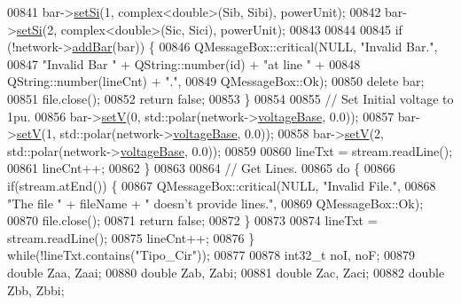 \begin{DoxyCode}
00841     bar->\hyperlink{group___models_ga74e510be49e50e4c14550b32e1dc92f9}{setSi}(1, complex<double>(Sib, Sibi), powerUnit);
00842     bar->\hyperlink{group___models_ga74e510be49e50e4c14550b32e1dc92f9}{setSi}(2, complex<double>(Sic, Sici), powerUnit);
00843 
00844 
00845     \textcolor{keywordflow}{if} (!network->\hyperlink{group___graphics_ga8c5dfef0216731246f7411e1a5fbee01}{addBar}(bar)) \{
00846       QMessageBox::critical(NULL, \textcolor{stringliteral}{"Invalid Bar."},
00847                             \textcolor{stringliteral}{"Invalid Bar "} + QString::number(\textcolor{keywordtype}{id}) + \textcolor{stringliteral}{"at line "} +
00848                             QString::number(lineCnt) + \textcolor{stringliteral}{"."},
00849                             QMessageBox::Ok);
00850       \textcolor{keyword}{delete} bar;
00851       file.close();
00852       \textcolor{keywordflow}{return} \textcolor{keyword}{false};
00853     \}
00854 
00855     \textcolor{comment}{// Set Initial voltage to 1pu.}
00856     bar->\hyperlink{group___models_ga9b6fbc92674bfcdc9d5090795ab335a6}{setV}(0, std::polar(network->\hyperlink{group___graphics_ga7c1e79d9ac69df9a69f24eaf092fd5e5}{voltageBase}, 0.0));
00857     bar->\hyperlink{group___models_ga9b6fbc92674bfcdc9d5090795ab335a6}{setV}(1, std::polar(network->\hyperlink{group___graphics_ga7c1e79d9ac69df9a69f24eaf092fd5e5}{voltageBase}, 0.0));
00858     bar->\hyperlink{group___models_ga9b6fbc92674bfcdc9d5090795ab335a6}{setV}(2, std::polar(network->\hyperlink{group___graphics_ga7c1e79d9ac69df9a69f24eaf092fd5e5}{voltageBase}, 0.0));
00859 
00860     lineTxt = stream.readLine();
00861     lineCnt++;
00862   \}
00863 
00864   \textcolor{comment}{// Get Lines.}
00865   \textcolor{keywordflow}{do} \{
00866     \textcolor{keywordflow}{if}(stream.atEnd()) \{
00867       QMessageBox::critical(NULL, \textcolor{stringliteral}{"Invalid File."},
00868                             \textcolor{stringliteral}{"The file "} + fileName + \textcolor{stringliteral}{" doesn't provide lines."},
00869                             QMessageBox::Ok);
00870       file.close();
00871       \textcolor{keywordflow}{return} \textcolor{keyword}{false};
00872     \}
00873 
00874     lineTxt = stream.readLine();
00875     lineCnt++;
00876   \} \textcolor{keywordflow}{while}(!lineTxt.contains(\textcolor{stringliteral}{"Tipo\_Cir"}));
00877 
00878   int32\_t noI, noF;
00879   \textcolor{keywordtype}{double} Zaa, Zaai;
00880   \textcolor{keywordtype}{double} Zab, Zabi;
00881   \textcolor{keywordtype}{double} Zac, Zaci;
00882   \textcolor{keywordtype}{double} Zbb, Zbbi;

\end{DoxyCode}
